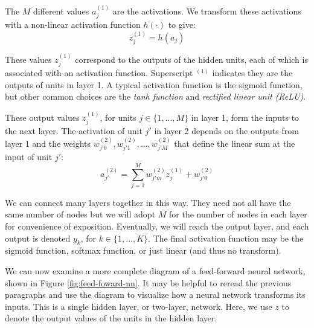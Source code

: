       
      The $M$ different values $a^{(1)}_{j}$ are the  activations. We transform these activations with a non-linear activation function $h(\cdot)$ to give:
\begin{equation} \label{basic-nn-z-outputs}
	z^{(1)}_{j} = h(a_{j})
      \end{equation}
      

These values $z^{(1)}_{j}$ correspond to the outputs of the hidden units, each of which is associated with an activation function. Superscript $^{(1)}$ indicates they are the outputs of units in layer 1.
A typical activation function is the  sigmoid function, but  other common choices are the {\em tanh function} and {\em  rectified linear unit (ReLU)}.

These output values $z^{(1)}_{j}$, for units $j\in \{1,\ldots,M\}$ in layer 1,
form the inputs to the next layer. The activation of unit $j'$ in layer 2 depends on the outputs from layer 1 and the weights $w^{(2)}_{j'0},w^{(2)}_{j'1},\ldots,w^{(2)}_{j'M}$ that define the linear sum at the input of unit $j'$:
%
\begin{equation} \label{basic-nn-form-next-layer}
	a^{(2)}_{j'} = \sum_{j=1}^{M} w_{j'm}^{(2)} z^{(1)}_{j} + w_{j'0}^{(2)}
      \end{equation}
      
      We can connect many layers together in this way. They need not all have the same number of nodes but we will adopt $M$ for the number of nodes in each layer for convenience of exposition. Eventually, we will reach the output layer, and each output is denoted $y_{k}$, for $k\in \{1,\dots,K\}$.
      The final activation function may be the sigmoid function, softmax function, or  just linear (and thus no transform).
      
We can now examine a more complete diagram of a feed-forward neural network, shown in Figure \ref{fig:feed-foward-nn}. It may be helpful to reread the previous paragraphs and use the diagram to visualize how a neural network transforms its inputs. This is a single hidden layer, or two-layer, network. Here, we use $z$ to denote the output values of the units in the hidden layer.

